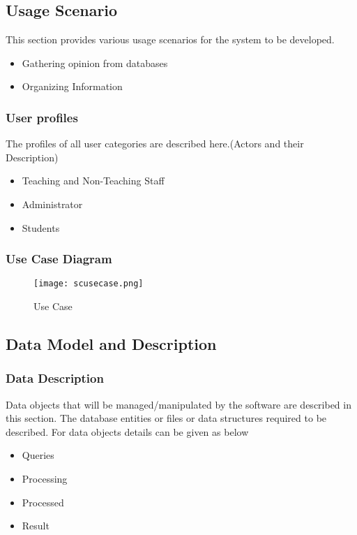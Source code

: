\documentclass[10pt,a4paper]
{article}
\numberwithin{table}{section}
\begin{document}
{{\begin{normalsize}
\begin{itemize}
\end{itemize}


\subsection{Usage Scenario}
This section provides various usage scenarios for the system to be developed. 
\begin{itemize}
\item Gathering opinion from databases
\item Organizing Information

\end{itemize}
 \subsubsection{User profiles}  
The profiles of all user categories are described here.(Actors and their Description)
\begin{itemize}
\item Teaching and Non-Teaching Staff
\item Administrator
\item Students

\end{itemize}

\newpage
\subsubsection{Use Case Diagram}


\begin{center}
	  \begin{figure}[h]
			\centering
			\texttt{[image: scusecase.png]}
			\caption{Use Case}
		\end{figure}
	\end{center}	





\subsection{Data Model and Description}  
\subsubsection{Data Description}  
\hspace*{0.3cm}Data objects that will be managed/manipulated by the software are described in this section. The database entities or files or data structures  required to be described. For data objects details can be given as below
\begin{itemize}
\item Queries
\item Processing 
\item Processed
\item Result
\end{itemize}

\end{normalsize}}}
\end{document}
